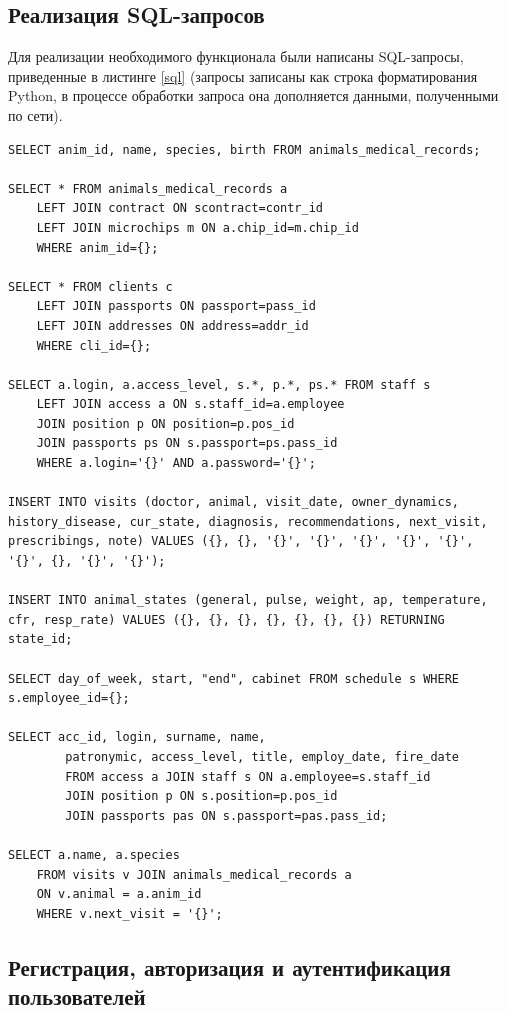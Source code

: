 \documentclass[a4paper,14pt]{article}
\begin{document}
\subsection{Реализация SQL-запросов}

Для реализации необходимого функционала были написаны SQL-запросы, приведенные в листинге \ref{sql} (запросы записаны как строка форматирования Python, в процессе обработки запроса она дополняется данными, полученными по сети).

\begin{lstlisting}[label=sql,caption=\text{SQL-запросы.}]
SELECT anim_id, name, species, birth FROM animals_medical_records;

SELECT * FROM animals_medical_records a 
	LEFT JOIN contract ON scontract=contr_id 
	LEFT JOIN microchips m ON a.chip_id=m.chip_id 
	WHERE anim_id={};

SELECT * FROM clients c 
	LEFT JOIN passports ON passport=pass_id 
	LEFT JOIN addresses ON address=addr_id 
	WHERE cli_id={};

SELECT a.login, a.access_level, s.*, p.*, ps.* FROM staff s 
	LEFT JOIN access a ON s.staff_id=a.employee 
	JOIN position p ON position=p.pos_id 
	JOIN passports ps ON s.passport=ps.pass_id 
	WHERE a.login='{}' AND a.password='{}';

INSERT INTO visits (doctor, animal, visit_date, owner_dynamics, history_disease, cur_state, diagnosis, recommendations, next_visit, prescribings, note) VALUES ({}, {}, '{}', '{}', '{}', '{}', '{}', '{}', {}, '{}', '{}');

INSERT INTO animal_states (general, pulse, weight, ap, temperature, cfr, resp_rate) VALUES ({}, {}, {}, {}, {}, {}, {}) RETURNING state_id;

SELECT day_of_week, start, "end", cabinet FROM schedule s WHERE s.employee_id={};

SELECT acc_id, login, surname, name,
		patronymic, access_level, title, employ_date, fire_date 
		FROM access a JOIN staff s ON a.employee=s.staff_id 
		JOIN position p ON s.position=p.pos_id 
		JOIN passports pas ON s.passport=pas.pass_id;

SELECT a.name, a.species 
	FROM visits v JOIN animals_medical_records a 
	ON v.animal = a.anim_id 
	WHERE v.next_visit = '{}';
\end{lstlisting}

\subsection{Регистрация, авторизация и аутентификация пользователей}
\end{document}
